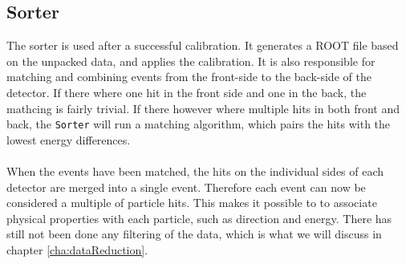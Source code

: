 \subsection{Sorter}
The sorter is used after a successful calibration. It generates a ROOT file based on the unpacked data, and applies the calibration. 
It is also responsible for matching and combining events from the front-side to the back-side of the detector. If there where one hit in the front side and one in the back, the mathcing is fairly trivial. If there however where multiple hits in both front and back, the \texttt{Sorter} will run a matching algorithm, which pairs the hits with the lowest energy differences. \\
\\
When the events have been matched, the hits on the individual sides of each detector are merged into a single event. 
Therefore each event can now be considered a multiple of particle hits. This makes it possible to to associate physical properties with each particle, such as direction and energy. 
There has still not been done any filtering of the data, which is what we will discuss in chapter \ref{cha:dataReduction}.


